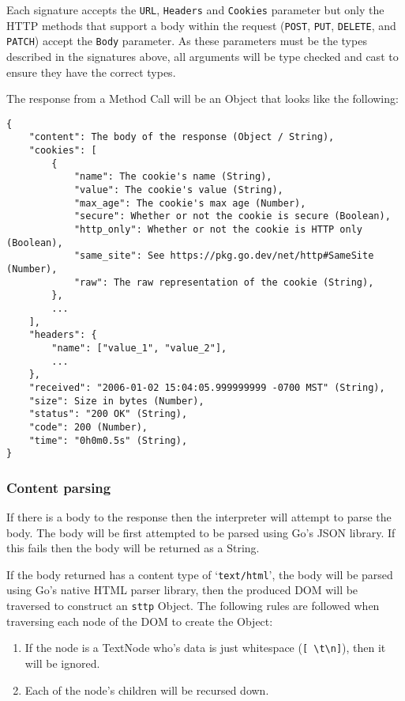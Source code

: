 Each signature accepts the \verb|URL|, \verb|Headers| and \verb|Cookies| parameter but only the HTTP methods that support a body within the request (\verb|POST|, \verb|PUT|, \verb|DELETE|, and \verb|PATCH|) accept the \verb|Body| parameter. As these parameters must be the types described in the signatures above, all arguments will be type checked and cast to ensure they have the correct types.

The response from a Method Call will be an Object that looks like the following:

\begin{verbatim}
{
    "content": The body of the response (Object / String),
    "cookies": [
        {
            "name": The cookie's name (String),
            "value": The cookie's value (String),
            "max_age": The cookie's max age (Number),
            "secure": Whether or not the cookie is secure (Boolean),
            "http_only": Whether or not the cookie is HTTP only (Boolean),
            "same_site": See https://pkg.go.dev/net/http#SameSite (Number),
            "raw": The raw representation of the cookie (String),
        },
        ...
    ],
    "headers": {
        "name": ["value_1", "value_2"],
        ...
    },
    "received": "2006-01-02 15:04:05.999999999 -0700 MST" (String),
    "size": Size in bytes (Number),
    "status": "200 OK" (String),
    "code": 200 (Number),
    "time": "0h0m0.5s" (String),
}
\end{verbatim}

\subsubsection{Content parsing}

If there is a body to the response then the interpreter will attempt to parse the body. The body will be first attempted to be parsed using Go's JSON library. If this fails then the body will be returned as a String.

If the body returned has a content type of `\verb|text/html|', the body will be parsed using Go's native HTML parser library, then the produced DOM will be traversed to construct an \verb|sttp| Object. The following rules are followed when traversing each node of the DOM to create the Object:

\begin{enumerate}
    \item If the node is a TextNode who's data is just whitespace (\verb|[ \t\n]|), then it will be ignored.
    \item Each of the node's children will be recursed down.
\end{enumerate}

